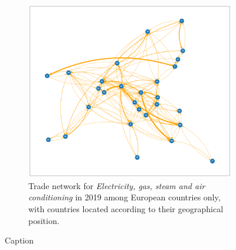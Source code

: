 \begin{figure}
    \begin{subfigure}{0.5\textheight}
    \centering
        \includegraphics[width=\textwidth]{pics/full_y19_p35_force_82.png}
        \caption[Trade network for \textit{Electricity, gas, steam and air conditioning} in 2019 among European countries only.]{Trade network for \textit{Electricity, gas, steam and air conditioning} in 2019 among European countries only, with countries located according to their geographical position.}
        \label{fig:elecgeoeur}
    \end{subfigure}
    \caption{Caption}
    \label{fig:elecnetwork}
\end{figure}


